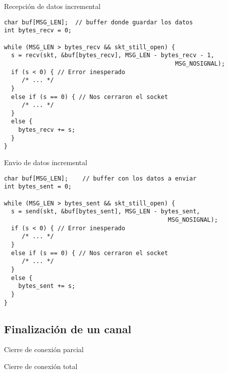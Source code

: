 \begin{frame}[fragile]{Recepci\'on de datos incremental}
      \begin{lstlisting}[style=normal]
char buf[MSG_LEN];  // buffer donde guardar los datos
int bytes_recv = 0;

while (MSG_LEN > bytes_recv && skt_still_open) {
  s = recv(skt, &buf[bytes_recv], MSG_LEN - bytes_recv - 1,
                                                MSG_NOSIGNAL);
  if (s < 0) { // Error inesperado
     /* ... */
  }
  else if (s == 0) { // Nos cerraron el socket
     /* ... */
  }
  else {
    bytes_recv += s;
  }
}
      \end{lstlisting}
\end{frame}
\begin{frame}[fragile]{Envio de datos incremental}
      \begin{lstlisting}[style=normal]
char buf[MSG_LEN];    // buffer con los datos a enviar
int bytes_sent = 0;

while (MSG_LEN > bytes_sent && skt_still_open) {
  s = send(skt, &buf[bytes_sent], MSG_LEN - bytes_sent,
                                              MSG_NOSIGNAL);
  if (s < 0) { // Error inesperado
     /* ... */
  }
  else if (s == 0) { // Nos cerraron el socket
     /* ... */
  }
  else {
    bytes_sent += s;
  }
}
      \end{lstlisting}
\end{frame}

\subsection{Finalizaci\'on de un canal}
\begin{frame}{Cierre de conexi\'on parcial}
\end{frame}

\begin{frame}{Cierre de conexi\'on total}
\end{frame}

